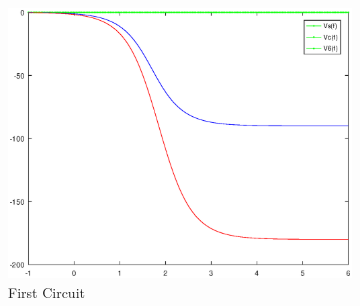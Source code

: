 

\begin{figure}[h] \centering

\begin{subfigure}{0.4\textwidth}
\includegraphics[width=\textwidth]{Arguments.eps}
\caption{First Circuit}
\label{fig:first}
\end{subfigure}
\begin{subfigure}{0.4\textwidth}

\end{subfigure}
\end{figure}
